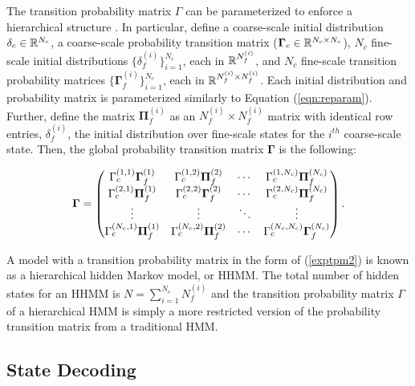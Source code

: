 The transition probability matrix $\Gamma$ can be parameterized to enforce a hierarchical structure \citep{Barajas:2017}. In particular, define a coarse-scale initial distribution $\delta_c \in \mathbb{R}^{N_c}$, a coarse-scale probability transition matrix ($\boldsymbol{\Gamma}_c \in \mathbb{R}^{{N_c} \times {N_c}}$), ${N_c}$ fine-scale initial distributions $\{\delta_f^{(i)}\}_{i=1}^{N_c}$, each in $\mathbb{R}^{N_f^{(i)}}$, and ${N_c}$ fine-scale transition probability matrices $\{\boldsymbol{\Gamma}_f^{(i)}\}_{i=1}^{N_c}$, each in $\mathbb{R}^{N_f^{(i)} \times N_f^{(i)}}$. Each initial distribution and probability matrix is parameterized similarly to Equation (\ref{eqn:reparam}). Further, define the matrix $\boldsymbol{\Pi}_f^{(i)}$ as an $N_f^{(i)} \times N_f^{(i)}$ matrix with identical row entries, $\delta_f^{(i)}$, the initial distribution over fine-scale states for the $i^{th}$ coarse-scale state. Then, the global probability transition matrix $\boldsymbol{\Gamma}$ is the following: %

\begin{equation} 
\boldsymbol{\Gamma} = 
\begin{pmatrix}
\Gamma_c^{(1,1)}\boldsymbol{\Gamma}_f^{(1)}     & \Gamma_c^{(1,2)} \boldsymbol{\Pi}_f^{(2)}     & \cdots & \Gamma_c^{(1,N_c)}\boldsymbol{\Pi}_f^{(N_c)}  \cr
\Gamma_c^{(2,1)}\boldsymbol{\Pi}_f^{(1)} & \Gamma_c^{(2,2)} \boldsymbol{\Gamma}_f^{(2)}  & \cdots & \Gamma_c^{(2,N_c)}\boldsymbol{\Pi}_f^{(N_c)} \cr
\vdots & \vdots & \ddots & \vdots \cr 
\Gamma_c^{(N_c,1)}\boldsymbol{\Pi}_f^{(1)} & \Gamma_c^{(N_c,2)}\boldsymbol{\Pi}_f^{(2)}      & \cdots & \Gamma_c^{(N_c,N_c)} \boldsymbol{\Gamma}_f^{(N_c)} 
\end{pmatrix}.
\label{exptpm2}
\end{equation}

A model with a transition probability matrix in the form of (\ref{exptpm2}) is known as a hierarchical hidden Markov model, or HHMM. The total number of hidden states for an HHMM is $N = \sum_{i=1}^{N_c} N_f^{(i)}$ and the transition probability matrix $\Gamma$ of a hierarchical HMM is simply a more restricted version of the probability transition matrix from a traditional HMM.

\subsection{State Decoding}

